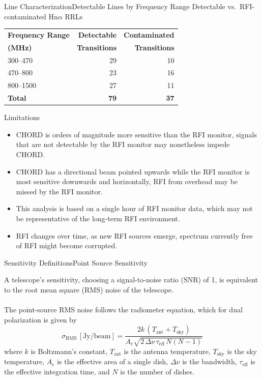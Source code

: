 \documentclass[aspectratio=169,t]{beamer}
\begin{document}
\begin{frame}{Line Characterization}{Detectable Lines by Frequency Range}
  \centering
  {Detectable vs.\ RFI-contaminated Hn$\alpha$ RRLs}
  \par\medskip
  \begin{tabular}{lrr}
    \toprule
    \textbf{Frequency Range} & \textbf{Detectable} & \textbf{Contaminated} \\
    \textbf{(MHz)} & \textbf{Transitions} & \textbf{Transitions} \\
    \midrule
    300--470   & 29 & 10 \\
    470--800   & 23 & 16 \\
    800--1500  & 27 & 11 \\
    \midrule
    \textbf{Total} & \textbf{79} & \textbf{37} \\
    \bottomrule
  \end{tabular}
  \par\medskip
\end{frame}

\begin{frame}{Limitations}{}
\begin{itemize}
    \item CHORD is orders of magnitude more sensitive than the RFI monitor, signals that are not detectable by the RFI monitor may nonetheless impede CHORD.
    \item CHORD has a directional beam pointed upwards while the RFI monitor is most sensitive downwards and horizontally, RFI from overhead may be missed by the RFI monitor.
    \item This analysis is based on a single hour of RFI monitor data, which may not be representative of the long-term RFI environment.
    \item RFI changes over time, as new RFI sources emerge, spectrum currently free of RFI might become corrupted.
\end{itemize}
\end{frame}

\begin{frame}{Sensitivity Definitions}{Point Source Sensitivity}

  A telescope's sensitivity, choosing a signal-to-noise ratio (SNR) of 1, is equivalent to the root mean square (RMS) noise of the telescope.\\
  ~\\
  The point-source RMS noise follows the radiometer equation, which for dual polarization is given by
  \[
  \sigma_{\mathrm{RMS}}\,[\mathrm{Jy/beam}] = \frac{2k\,(T_{\mathrm{ant}}+T_{\mathrm{sky}})}{A_e\sqrt{2\,\Delta\nu\,\tau_{\mathrm{eff}}\,N(N-1)}}
  \]
  where $k$ is Boltzmann's constant, $T_{\mathrm{ant}}$ is the antenna temperature, $T_{\mathrm{sky}}$ is the sky temperature, $A_e$ is the effective area of a single dish, $\Delta\nu$ is the bandwidth, $\tau_{\mathrm{eff}}$ is the effective integration time, and $N$ is the number of dishes.
\end{frame}
\end{document}
